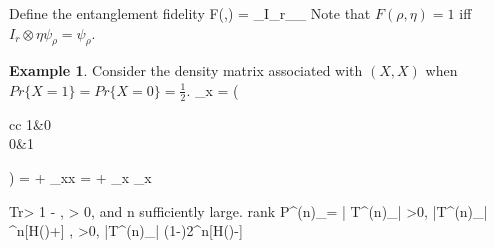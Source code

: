 \documentclass[aps,11pt,twoside,letterpaper]{article}
\def \Tr{\textup{Tr}}
\theoremstyle{plain}
\theoremstyle{definition}
\newtheorem{Ex}[Th]{Example}
\newcommand{\braOket}[3]{\left\langle #1\vert#2\vert#3 \right\rangle}
\begin{document}

Define the entanglement fidelity
\be
	F(\rho,\eta) = \braOket{\psi_\rho}{I_r\otimes\eta \psi_\rho}{\psi_\rho}
\ee
Note that $F(\rho,\eta)=1$ iff $I_r\otimes\eta \psi_\rho = \psi_\rho$.

\begin{Ex}
	Consider the density matrix associated with $(X,X)$ when $Pr\{X=1\}=Pr\{X=0\}=\frac{1}{2}$.
	\be
		\rho_x =  \left( \begin{array}{cc} 1&0\\0&1 \end{array} \right) =  
			   +  
	\ee 
	\be
		\rho_{xx} =  +  \neq \rho_x \otimes \rho_x
	\ee
\end{Ex}

%




	\be 
		\Tr{} > 1 - \delta \qquad \forall \delta, \epsilon > 0, 
		\textrm{and } n \textrm{ sufficiently large.}  			
		\label{here_one}
	\ee
	\be
		\textup{rank} P^{(n)}_\epsilon = | T^{(n)}_\epsilon |
		\label{here_two}
	\ee
	\be
		\forall \epsilon >0, \quad |T^{(n)}_\epsilon| ^{n[H(\rho)+\epsilon]} 
		\label{here_three}
	\ee
	\be
		\forall \epsilon, \delta >0, \quad |T^{(n)}_\epsilon| \geq (1-\delta)2^{n[H(\rho)-\epsilon]} 
		\label{here_four}
	\ee
\end{document}
